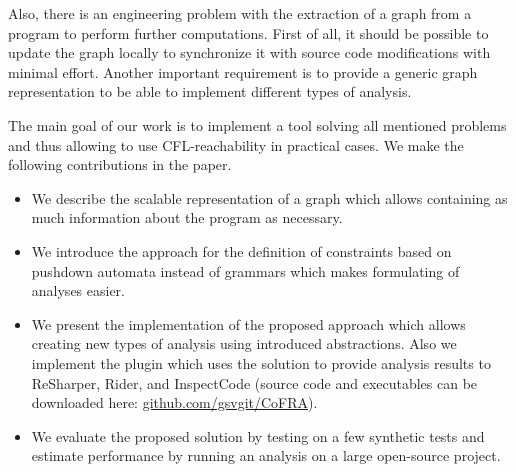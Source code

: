 Also, there is an engineering problem with the extraction of a graph from a program to perform further computations.
First of all, it should be possible to update the graph locally to synchronize it with source code modifications with minimal effort.
Another important requirement is to provide a generic graph representation to be able to implement different types of analysis.

The main goal of our work is to implement a tool solving all mentioned problems and thus allowing to use CFL-reachability in practical cases.
We make the following contributions in the paper.
\begin{itemize}
	\item We describe the scalable representation of a graph which allows containing as much information about the program as necessary.
	\item We introduce the approach for the definition of constraints based on pushdown automata instead of grammars which makes formulating of analyses easier.
	\item We present the implementation of the proposed approach which allows creating new types of analysis using introduced abstractions.
	Also we implement the plugin which uses the solution to provide analysis results to ReSharper, Rider, and InspectCode (source code and executables can be downloaded here: \url{github.com/gsvgit/CoFRA}).
	\item We evaluate the proposed solution by testing on a few synthetic tests and estimate performance by running an analysis on a large open-source project.
\end{itemize}

